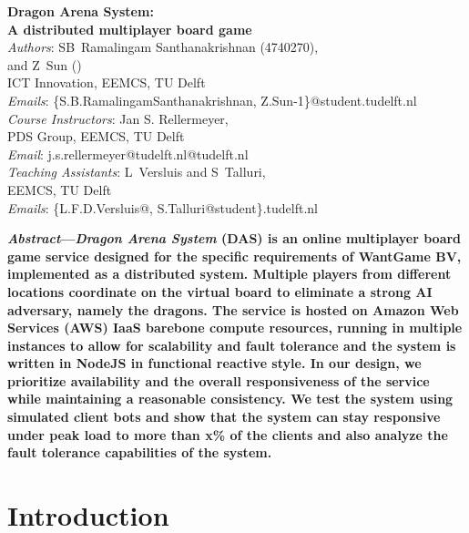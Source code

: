 \documentclass[a4paper]{IEEEtran}
\begin{document}
  
  \setlength{\tabcolsep}{10pt}
  \renewcommand{\arraystretch}{1.25}
  
  \begin{center}
    \textbf{\Large{
      Dragon Arena System: \\ A distributed multiplayer board game
    }}\\
    \vspace{0.25cm}
    \emph{Authors}: SB~Ramalingam Santhanakrishnan (4740270), \\ and Z~Sun () \\
    ICT Innovation, EEMCS, TU Delft\\
    \emph{Emails}: \{S.B.RamalingamSanthanakrishnan, Z.Sun-1\}@student.tudelft.nl\\
    \vspace{0.2cm}
    \emph{Course Instructors}: Jan S. Rellermeyer,\\
    PDS Group, EEMCS, TU Delft\\
    \emph{Email}: j.s.rellermeyer@tudelft.nl@tudelft.nl\\
    \vspace{0.2cm}
    \emph{Teaching Assistants}: L~Versluis and S~Talluri,\\
    EEMCS, TU Delft\\
    \emph{Emails}: {\{L.F.D.Versluis@, S.Talluri@student\}.tudelft.nl}\\
  \end{center}
  
  \vspace{0.2cm}
  
  \textbf{
    \emph{Abstract}---\emph{Dragon Arena System} (DAS) is an online multiplayer board game service designed for the specific requirements of WantGame BV, implemented as a distributed system. Multiple players from different locations coordinate on the virtual board to eliminate a strong AI adversary, namely the dragons. The service is hosted on Amazon Web Services (AWS) IaaS barebone compute resources, running in multiple instances to allow for scalability and fault tolerance and the system is written in NodeJS in functional reactive style. In our design, we prioritize availability and the overall responsiveness of the service while maintaining a reasonable consistency. We test the system using simulated client bots and show that the system can stay responsive under peak load to more than x\% of the clients and also analyze the fault tolerance capabilities of the system. 
  }
  
  \section{Introduction}
  
\end{document}

